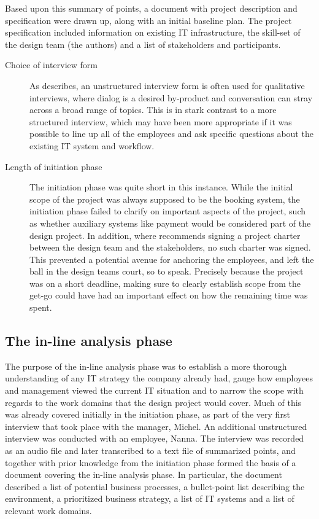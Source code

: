 Based upon this summary of points, a document with project description and
specification were drawn up, along with an initial baseline plan. The project
specification included information on existing IT infrastructure, the skill-set
of the design team (the authors) and a list of stakeholders and participants.

\begin{description}
    \item [Choice of interview form] As \cite[p.228]{bodker2004participatory} describes,
        an unstructured interview form is often used for qualitative interviews,
        where dialog is a desired by-product and conversation can stray across a
        broad range of topics. This is in stark contrast to a more structured
        interview, which may have been more appropriate if it was possible to line 
        up all of the employees and ask specific questions about the existing IT
        system and workflow.

    \item [Length of initiation phase] The initiation phase was quite short in this instance.
        While the initial scope of the project was always supposed to be the
        booking system, the initiation phase failed to clarify on important
        aspects of the project, such as whether auxiliary systems like payment 
        would be considered part of the design project. In addition, where
        \cite{bodker2004participatory} recommends signing a project charter
        between the design team and the stakeholders, no such charter was
        signed. This prevented a potential avenue for anchoring the employees,
        and left the ball in the design teams court, so to speak. Precisely
        because the project was on a short deadline, making sure to clearly
        establish scope from the get-go could have had an important effect on
        how the remaining time was spent.
\end{description}

\subsection{The in-line analysis phase}
The purpose of the in-line analysis phase was to establish a more thorough
understanding of any IT strategy the company already had, gauge how \gomonkey{}
employees and management viewed the current IT situation and to narrow the scope
with regards to the work domains that the design project would cover. Much of
this was already covered initially in the initiation phase, as part of the very
first interview that took place with the manager, Michel. An additional
unstructured interview was conducted with an employee, Nanna. The interview was
recorded as an audio file and later transcribed to a text file of summarized
points, and together with prior knowledge from the initiation phase formed the
basis of a document covering the in-line analysis phase. In particular, the
document described a list of potential business processes, a bullet-point list
describing the environment, a prioritized business strategy, a list of IT
systems and a list of relevant work domains. 

